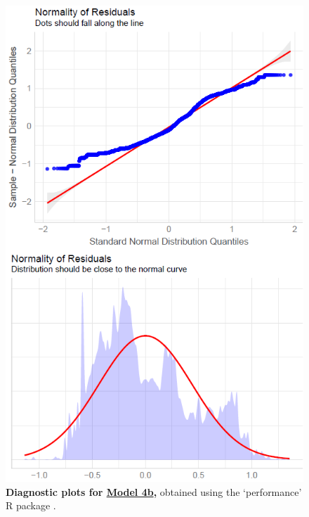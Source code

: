 \begin{figure}[h!]
\centering
\includegraphics[scale=0.8]{Supporting/Chapter3/Figures/Diagnostics/Diag_model4b.png}
\caption[Diagnostic plots for Model 4b]{\textbf{Diagnostic plots for \underline{Model 4b},} obtained using the `performance' R package \citep{performance}.}
\label{SI3_F15}
\end{figure}

